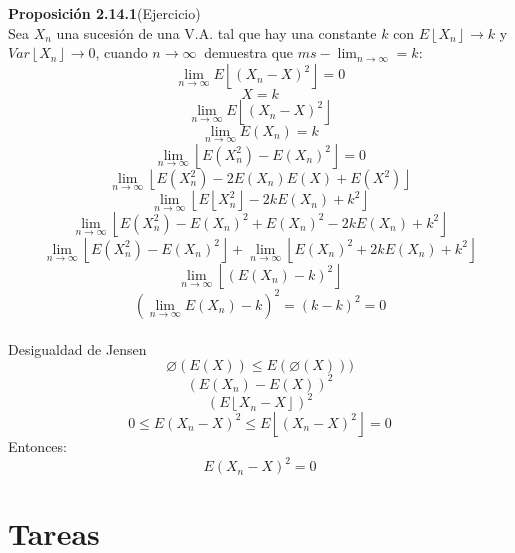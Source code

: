 \documentclass[11pt,fleqn]{book} %
\numberwithin{equation}{section} %
\numberwithin{figure}{section} %
\numberwithin{table}{section} %
\begin{document}
\textbf{Proposición 2.14.1}(Ejercicio)
\ \\%
Sea $X_{n}$ una sucesión de una V.A. tal que hay una constante $k$ con $E\left \lfloor X_{n} \right \rfloor\rightarrow k $ y $Var\left \lfloor X_{n} \right \rfloor\rightarrow 0$, cuando $ n \rightarrow \infty\ $  demuestra que $ ms-\lim_{n \to \infty }=k$:
$$\lim_{n \to \infty }E\left \lfloor (X_n-X)^2 \right \rfloor=0$$
$$X=k$$
$$\lim_{n \to \infty } E\left \lfloor (X_n-X)^2 \right \rfloor$$
$$\lim_{n \to \infty }E(X_n)=k$$
$$\lim_{n\rightarrow \infty }\left \lfloor E(X_n^2)-E(X_n)^2 \right \rfloor=0$$
$$\lim_{n \to \infty }\left \lfloor E(X_n^2)-2E(X_n)E(X)+E(X^2) \right \rfloor$$
$$\lim_{n \to \infty }\left \lfloor E\left \lfloor X_n^2 \right \rfloor-2kE(X_n)+k^2 \right \rfloor$$
$$\lim_{n \to \infty }\left \lfloor E(X_n^2)-E(X_n)^2+E(X_n)^2-2kE(X_n)+k^2 \right \rfloor$$
$$\lim_{n \to \infty }\left \lfloor E(X_n^2)-E(X_n)^2 \right \rfloor+\lim_{n \to \infty }\left \lfloor E(X_n)^2+2kE(X_n)+k^2 \right \rfloor$$
$$\lim_{n \to \infty }\left \lfloor (E(X_n)-k)^2 \right \rfloor$$
$$(\lim_{n \to \infty }E(X_n)-k)^2=(k-k)^2=0$$
\ \\%
Desigualdad de Jensen
$$\varnothing (E(X))\leq E(\varnothing (X)))$$
$$(E(X_n)-E(X))^2$$
$$(E\left \lfloor X_n-X \right \rfloor)^2$$
$$0\leq E(X_n-X)^2\leq E\left \lfloor (X_n-X)^2 \right \rfloor=0$$
Entonces:
$$ E(X_n-X)^2 = 0 $$ 
\newpage
\section{Tareas}
\end{document}
